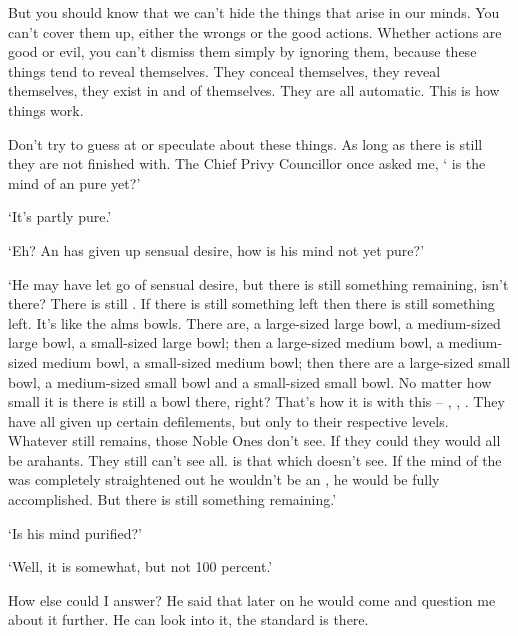 But you should know that we can't hide the things that arise in our minds. You can't cover them up, either the wrongs or the good actions. Whether actions are good or evil, you can't dismiss them simply by ignoring them, because these things tend to reveal themselves. They conceal themselves, they reveal themselves, they exist in and of themselves. They are all automatic. This is how things work. 

Don't try to guess at or speculate about these things. As long as there is still  they are not finished with. The Chief Privy Councillor once asked me, ` is the mind of an  pure yet?' 

`It's partly pure.' 

`Eh? An  has given up sensual desire, how is his mind not yet pure?' 

`He may have let go of sensual desire, but there is still something remaining, isn't there? There is still . If there is still something left then there is still something left. It's like the  alms bowls. There are, a large-sized large bowl, a medium-sized large bowl, a small-sized large bowl; then a large-sized medium bowl, a medium-sized medium bowl, a small-sized medium bowl; then there are a large-sized small bowl, a medium-sized small bowl and a small-sized small bowl. No matter how small it is there is still a bowl there, right? That's how it is with this -- , , . They have all given up certain defilements, but only to their respective levels. Whatever still remains, those Noble Ones don't see. If they could they would all be arahants. They still can't see all.  is that which doesn't see. If the mind of the  was completely straightened out he wouldn't be an , he would be fully accomplished. But there is still something remaining.'

`Is his mind purified?' 

`Well, it is somewhat, but not 100 percent.' 

How else could I answer? He said that later on he would come and question me about it further. He can look into it, the standard is there. 

